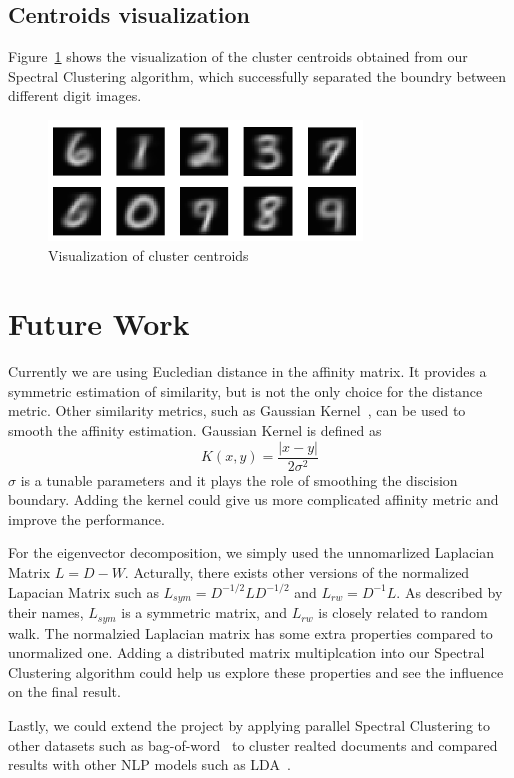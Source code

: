 \documentclass{acm_proc_article-sp}
\begin{document}
\subsection{Centroids visualization}
Figure~\ref{visual_centroids} shows the visualization of the cluster centroids obtained from our Spectral Clustering algorithm, which successfully separated the boundry between different digit images.

\begin{figure}[ht]
\centering
\includegraphics[height=3.2cm]{scdigits.png}
\caption{Visualization of cluster centroids}
\label{visual_centroids}
\end{figure}

\section{Future Work}
Currently we are using Eucledian distance in the affinity matrix. It provides a symmetric estimation of similarity, but is not the only choice for the distance metric. Other similarity metrics, such as Gaussian Kernel~\cite{keerthi2003asymptotic}, can be used to smooth the affinity estimation. Gaussian Kernel is defined as $$K(x, y) = \frac{|x - y|}{2\sigma^2}$$ $\sigma$ is a tunable parameters and it plays the role of smoothing the discision boundary. Adding the kernel could give us more complicated affinity metric and improve the performance.

For the eigenvector decomposition, we simply used the unnomarlized Laplacian Matrix $L = D - W$. Acturally, there exists other versions of the normalized Lapacian Matrix such as $L_{sym} = D^{-1/2}LD^{-1/2}$ and $L_{rw} = D^{-1}L$. As described by their names, $L_{sym}$ is a symmetric matrix, and $L_{rw}$ is closely related to random walk. The normalzied Laplacian matrix has some extra properties compared to unormalized one. Adding a distributed matrix multiplcation into our Spectral Clustering algorithm could help us explore these properties and see the influence on the final result.

Lastly, we could extend the project by applying parallel Spectral Clustering to other datasets such as bag-of-word~\cite{Lichman:2013} to cluster realted documents and compared results with other NLP models such as LDA~\cite{blei2003latent}.
\end{document}
